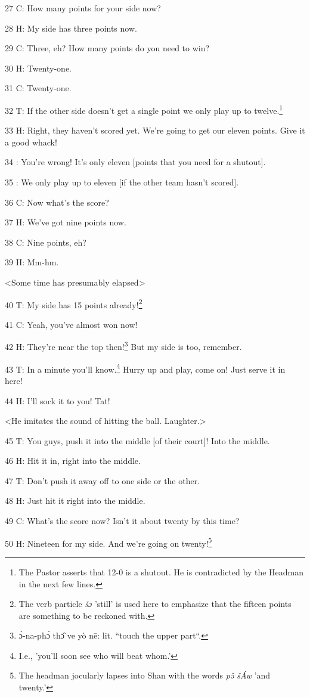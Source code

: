 27 C: How many points for your side now?

28 H: My side has three points now.

29 C: Three, eh? How many points do you need to win?

30 H: Twenty-one.

31 C: Twenty-one.

32 T: If the other side doesn't get a single point we only play up to twelve.\footnote{The Pastor asserts that 12-0 is a shutout. He is contradicted by the Headman in the next few lines.}

33 H: Right, they haven't scored yet. We're going to get our eleven points. Give
it a good whack!

34 : You're wrong! It's only eleven [points that you need for a shutout].

35 : We only play up to eleven [if the other team hasn't scored].

36 C: Now what's the score?

37 H: We've got nine points now.

38 C: Nine points, eh?

39 H: Mm-hm.

<Some time has presumably elapsed>

40 T: My side has 15 points already!\footnote{The verb particle\textit{ šɔ} 'still' is used here to emphasize that the fifteen points are something to be reckoned with.}

41 C: Yeah, you've almost won now!

42 H: They're near the top then!\footnote{ɔ̀-na-phɔ́ thɔ̂ ve yò nē: lit. ``touch the upper part``.} But my side is too, remember.

43 T: In a minute you'll know.\footnote{I.e., 'you'll soon see who will beat whom.'} Hurry up and play, come on! Just serve it in
here!

44 H: I'll sock it to you! Tat!

<He imitates the sound of hitting the ball. Laughter.>

45 T: You guys, push it into the middle [of their court]! Into the middle.

46 H: Hit it in, right into the middle.

47 T: Don't push it away off to one side or the other.

48 H: Just hit it right into the middle.

49 C: What's the score now? Isn't it about twenty by this time?

50 H: Nineteen for my side. And we're going on twenty!\footnote{The headman jocularly lapses into Shan with the words \textit{pə̂ šÁw} 'and twenty.'}

